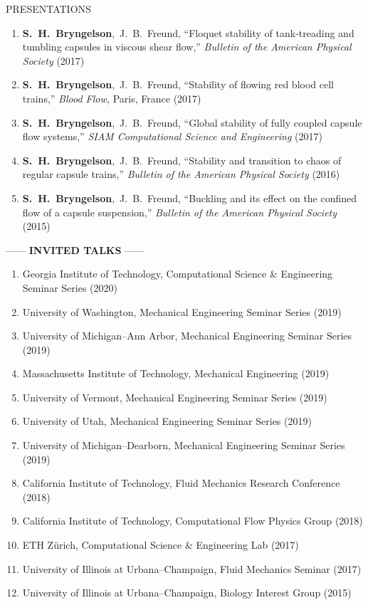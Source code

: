 \documentclass{resume} %
\makeatletter
\newlength{\bibhang}
\newlength{\bibsep}
\newenvironment{bibsection}%
        {\begin{enumerate}{}{%
       \setlength{\leftmargin}{\bibhang}%
       \setlength{\itemindent}{-\leftmargin}%
       \setlength{\itemsep}{\bibsep}%
       \setlength{\parsep}{\z@}%
        \setlength{\topsep}{0pt}}}
        {\end{enumerate}\vspace{-.1\baselineskip}}
\newcommand\Authors{\mbox{\textbf{S. H. Bryngelson}, J. B. Freund}}
\newcommand{\APS}{Bulletin of the American Physical Society}
\makeatother
\begin{document}
\begin{rSection}{{\Large P}RESENTATIONS}
\begin{bibsection}
	\item \Authors, 
    ``Floquet stability of tank-treading and tumbling capsules in viscous shear flow,'' 
	\textit{\APS} (2017)

	\item \Authors, 
    ``Stability of flowing red blood cell trains,'' 
	\textit{Blood Flow,} Paris, France (2017)			

	\item \Authors, 
    ``Global stability of fully coupled capsule flow systems,'' 
	\textit{SIAM Computational Science and Engineering} (2017)	

	\item \Authors, 
    ``Stability and transition to chaos of regular capsule trains,'' 
	\textit{\APS} (2016)		

	\item \Authors, 
    ``Buckling and its effect on the confined flow of a capsule suspension,'' 
    \textit{\APS} (2015)

\end{bibsection}
\medskip 

\begin{center}
    ------ \textbf{INVITED TALKS} ------
\end{center}

\begin{bibsection}
    \setlength{\itemsep}{\bibsep}%
    \item Georgia Institute of Technology, Computational Science \& Engineering Seminar Series (2020)
    \item University of Washington, Mechanical Engineering Seminar Series (2019)
    \item University of Michigan--Ann Arbor, Mechanical Engineering Seminar Series (2019)
    \item Massachusetts Institute of Technology, Mechanical Engineering (2019)
    \item University of Vermont, Mechanical Engineering Seminar Series (2019)
    \item University of Utah, Mechanical Engineering Seminar Series (2019)
    \item University of Michigan--Dearborn, Mechanical Engineering Seminar Series (2019)
    \item California Institute of Technology, Fluid Mechanics Research Conference (2018)
    \item California Institute of Technology, Computational Flow Physics Group (2018)	
    \item ETH Z\"{u}rich, Computational Science \& Engineering Lab (2017)
    \item University of Illinois at Urbana--Champaign, Fluid Mechanics Seminar (2017)
    \item University of Illinois at Urbana--Champaign, Biology Interest Group (2015)
\end{bibsection}

\end{rSection}
\end{document}
